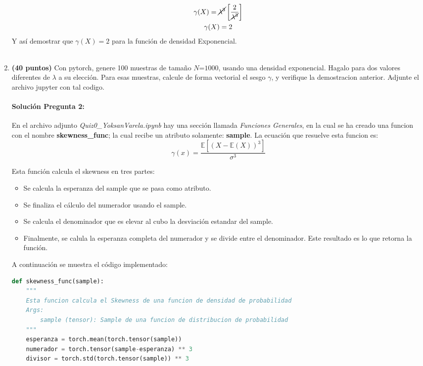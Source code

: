 \documentclass[spanish]{article}
\begin{document}
\begin{enumerate}
\begin{gather*}
    \gamma(X) =\cancel{\lambda^{3}}\left[\frac{2}{\cancel{\lambda^3}}\right]\\
    \gamma(X) = 2
\end{gather*}
Y as\'{i} demostrar que $\gamma(X)=2$ para la funci\'{o}n de densidad Exponencial.\\
\\
\item \textbf{(40 puntos)} Con pytorch, genere 100 muestras de tama\~{n}o
$N\text{=1000}$, usando una densidad exponencial. Hagalo para dos
valores diferentes de $\lambda$ a su elecci\'{o}n. Para esas muestras,
calcule de forma vectorial el sesgo $\gamma$, y verifique la demostracion
anterior. Adjunte el archivo jupyter con tal codigo.

\paragraph{Soluci\'{o}n Pregunta 2:}
En el archivo adjunto \emph{Quiz0\_YoksanVarela.ipynb} hay una secci\'{o}n llamada \emph{Funciones Generales}, en la cual se ha creado una funcion con el nombre \textbf{skewness\_func}; la cual recibe un atributo solamente: \textbf{sample}. La ecuaci\'{o}n que resuelve esta funcion es:\\
\begin{equation}
\gamma(x) =\frac{\mathbb{E}\left[(X-\mathbb{E}(X))^3\right]}{\sigma^{3}} 
\end{equation}

Esta funci\'{o}n calcula el skewness en tres partes:
\begin{itemize}
    \item Se calcula la esperanza del sample que se pasa como atributo.
    \item Se finaliza el c\'{a}lculo del numerador usando el sample.
    \item Se calcula el denominador que es elevar al cubo la desviaci\'{o}n estandar del sample.
    \item Finalmente, se calula la esperanza completa del numerador y se divide entre el denominador. Este resultado es lo que retorna la funci\'{o}n.
\end{itemize}
A continuaci\'{o}n se muestra el c\'{o}digo implementado:
\begin{lstlisting}[language=Python]
def skewness_func(sample):
    """
    Esta funcion calcula el Skewness de una funcion de densidad de probabilidad
    Args:
        sample (tensor): Sample de una funcion de distribucion de probabilidad
    """
    esperanza = torch.mean(torch.tensor(sample))
    numerador = torch.tensor(sample-esperanza) ** 3
    divisor = torch.std(torch.tensor(sample)) ** 3
    

\end{lstlisting}
\end{enumerate}
\end{document}
